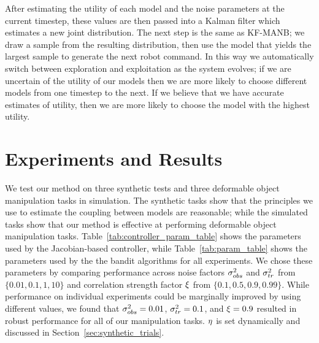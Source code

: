 After estimating the utility of each model and the noise parameters at the current timestep, these values are then passed into a Kalman filter which estimates a new joint distribution. The next step is the same as KF-MANB; we draw a sample from the resulting distribution, then use the model that yields the largest sample to generate the next robot command. In this way we automatically switch between exploration and exploitation as the system evolves; if we are uncertain of the utility of our models then we are more likely to choose different models from one timestep to the next. If we believe that we have accurate estimates of utility, then we are more likely to choose the model with the highest utility.


\FloatBarrier
\section{Experiments and Results}

We test our method on three synthetic tests and three deformable object manipulation tasks in simulation. The synthetic tasks show that the principles we use to estimate the coupling between models are reasonable; while the simulated tasks show that our method is effective at performing deformable object manipulation tasks. Table~\ref{tab:controller_param_table} shows the parameters used by the Jacobian-based controller, while Table~\ref{tab:param_table} shows the parameters used by the the bandit algorithms for all experiments. We chose these parameters by comparing performance across noise factors $\sigma_{obs}^2$ and $\sigma_{tr}^2$ from $\{0.01, 0.1, 1, 10\}$ and correlation strength factor $\xi$ from $\{0.1, 0.5, 0.9, 0.99\}$. While performance on individual experiments could be marginally improved by using different values, we found that $\sigma_{obs}^2=0.01$, $\sigma_{tr}^2=0.1$, and $\xi=0.9$ resulted in robust performance for all of our manipulation tasks. $\eta$ is set dynamically and discussed in Section~\ref{sec:synthetic_trials}.

